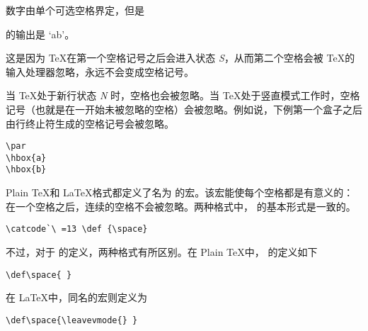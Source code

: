 \documentclass{book}
\begin{document}
数字由单个可选空格界定，但是
\begin{disp}\quad 的输出是 \quad `ab'。\end{disp}这是因为 \TeX 在第一个空格记号之后会进入状态 {\itshape S}，从而第二个空格会被 \TeX 的输入处理器忽略，永远不会变成空格记号。

当 \TeX 处于新行状态 {\itshape N} 时，空格也会被忽略。当 \TeX 处于竖直模式工作时，空格记号（也就是在一开始未被忽略的空格）会被忽略。例如说，下例第一个盒子之后由行终止符生成的空格记号会被忽略。
\begin{verbatim}
\par
\hbox{a}
\hbox{b}
\end{verbatim}

Plain \TeX 和 \LaTeX 格式都定义了名为  的宏。该宏能使每个空格都是有意义的：在一个空格之后，连续的空格不会被忽略。两种格式中， 的基本形式是一致的。
\begin{verbatim}
\catcode`\ =13 \def {\space}
\end{verbatim}
不过，对于  的定义，两种格式有所区别。在 Plain \TeX 中， 的定义如下
\begin{verbatim}
\def\space{ }
\end{verbatim}
在 \LaTeX 中，同名的宏则定义为
\begin{verbatim}
\def\space{\leavevmode{} }
\end{verbatim}
\end{document}
